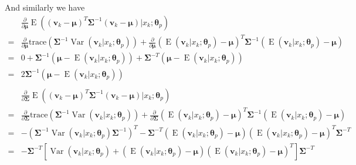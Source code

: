 \documentclass{article}
\DeclareMathOperator{\Var}{Var}
\DeclareMathOperator{\E}{E}
\begin{document}
\begin{enumerate}[font = \bfseries, leftmargin = 0 em]
	And similarly we have
	\begin{align*}
	&\frac{\partial}{\partial \bm \mu} \E\left((\bm v_k - \bm \mu)^T\bm \Sigma^{-1}(\bm v_k - \bm \mu)\big| x_k; \bm \theta_p\right)\\
	=& \frac{\partial}{\partial \bm \mu}\mathrm{trace}\left(\bm \Sigma^{-1} \Var(\bm v_k | x_k; \bm \theta_p)\right) + \frac{\partial}{\partial \bm \mu}\left(\E(\bm v_k|x_k; \bm \theta_p) - \bm \mu\right)^T\bm \Sigma^{-1}\left(\E(\bm v_k|x_k; \bm \theta_p) - \bm \mu\right)\\
	=& 0 + \bm \Sigma^{-1}\left(\bm \mu - \E(\bm v_k|x_k; \bm \theta_p)\right) + \bm \Sigma^{-T}\left(\bm \mu - \E(\bm v_k|x_k; \bm \theta_p)\right)\\
	= & 2 \bm \Sigma^{-1} \left(\bm \mu - \E(\bm v_k|x_k; \bm \theta_p)\right)
	\ \\
	\ \\
	&\frac{\partial}{\partial \bm \Sigma}\E\left((\bm v_k - \bm \mu)^T\bm \Sigma^{-1}(\bm v_k - \bm \mu)\big| x_k; \bm \theta_p\right)\\
	=& \frac{\partial}{\partial \bm \Sigma}\mathrm{trace}\left(\bm \Sigma^{-1} \Var(\bm v_k | x_k; \bm \theta_p)\right) + \frac{\partial}{\partial \bm \Sigma}\left(\E(\bm v_k|x_k; \bm \theta_p) - \bm \mu\right)^T\bm \Sigma^{-1}\left(\E(\bm v_k|x_k; \bm \theta_p) - \bm \mu\right)\\
	= & -\left(\bm \Sigma^{-1} \Var\left(\bm v_k|x_k; \bm \theta_p\right) \bm \Sigma^{-1}\right)^T - \bm \Sigma^{-T}\left(\E(\bm v_k|x_k; \bm \theta_p) - \bm \mu\right)\left(\E(\bm v_k|x_k; \bm \theta_p) - \bm \mu\right)^T \bm \Sigma^{-T}\\
	=& - \bm \Sigma^{-T} \left[\Var\left(\bm v_k|x_k; \bm \theta_p\right) + \left(\E(\bm v_k|x_k; \bm \theta_p) - \bm \mu\right)\left(\E(\bm v_k|x_k; \bm \theta_p) - \bm \mu\right)^T\right]\bm \Sigma^{-T}
	\end{align*}


\end{enumerate}
\end{document}
